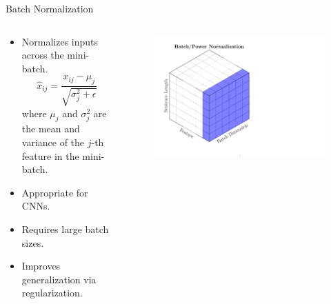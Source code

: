 \begin{frame}{Batch Normalization}
    \begin{columns}
        \begin{column}{0.65\linewidth}
        \begin{itemize}
            \item Normalizes inputs across the mini-batch.
            \[
            \hat{x}_{ij} = \frac{x_{ij} - \mu_{j}}{\sqrt{\sigma^2_{j} + \epsilon}}
            \]
            where \( \mu_{j} \) and \( \sigma^2_{j} \) are the mean and variance of the \( j \)-th feature in the mini-batch.
            \item Appropriate for CNNs.
            \item Requires large batch sizes.
            \item Improves generalization via regularization.
        \end{itemize}
        \end{column} 
        \begin{column}{0.4\linewidth} 
        \begin{figure}
            \centering
            \includegraphics[width=1.5\linewidth]{pic/PN_vis.pdf}
            \label{fig:bn}
        \end{figure}
        \end{column}
    \end{columns}
\end{frame}

